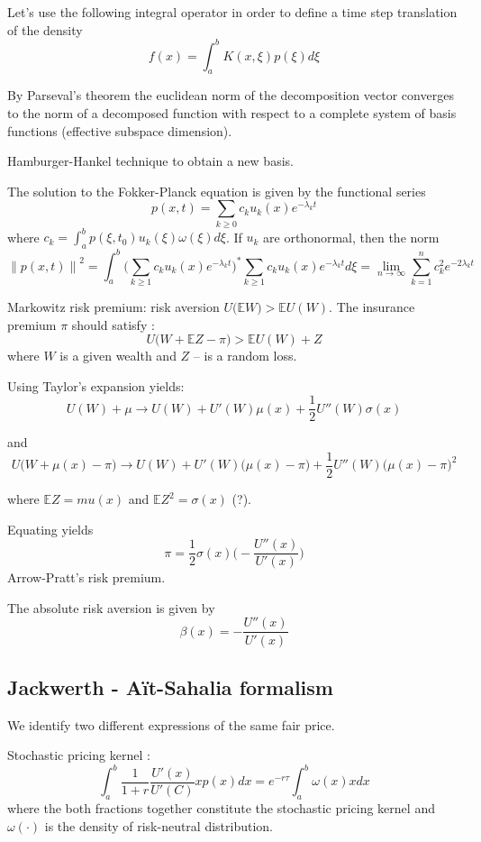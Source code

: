 \documentclass[a4paper]{article}
\newcommand{\nrm}[1]{{\left\| #1 \right \|}}
\newcommand{\Ex}{\mathbb{E}}
\begin{document}
Let's use the following integral operator in order to define a time step translation of the density
\[f(x) = \int_a^b K(x,\xi) p(\xi) d\xi\]

By Parseval's theorem the euclidean norm of the decomposition vector converges to the norm of a decomposed function with respect to a complete system of basis functions (effective subspace dimension).

Hamburger-Hankel technique to obtain a new basis.



The solution to the Fokker-Planck equation is given by the functional series
\[p(x,t) = \sum_{k\geq 0} c_k u_k(x) e^{-\lambda_k t}\]
where $c_k = \int_a^b p(\xi,t_0) u_k(\xi) \omega(\xi) d\xi$.
If $u_k$ are orthonormal, then the norm
\[\nrm{p(x,t)}^2 = \int_a^b \Big( \sum_{k\geq1} c_k u_k(x) e^{-\lambda_k t}\Big)^* \sum_{k\geq1} c_k u_k(x) e^{-\lambda_k t} d\xi = \lim_{n\to \infty} \sum_{k=1}^n c_k^2 e^{-2\lambda_k t} \]


Markowitz risk premium: risk aversion $U\big(\Ex W\big) > \Ex U(W)$.
The insurance premium $\pi$ should satisfy :
\[U\big(W + \Ex Z - \pi) > \Ex U(W) + Z \]
where $W$ is a given wealth and $Z$ -- is a random loss.

Using Taylor's expansion yields:
\[U(W) + \mu \to U(W) + U'(W)\mu(x) + \frac{1}{2} U''(W) \sigma(x)\]

and 
\[U\Big( W + \mu(x) - \pi \Big) \to U(W) + U'(W)\big(\mu(x)-\pi\big) + \frac{1}{2} U''(W) \big(\mu(x)-\pi\big)^2\]

where $\Ex Z = mu(x)$ and $\Ex Z^2 = \sigma(x)$ (?).

Equating yields
\[ \pi = \frac{1}{2}\sigma(x) \Big(-\frac{U''(x)}{U'(x)}\Big)\]
Arrow-Pratt's risk premium.

The absolute risk aversion is given by 
\[\beta(x) = -\frac{U''(x)}{U'(x)}\]

\subsection{Jackwerth - A\"it-Sahalia formalism} %
\label{sub:jackwerth_ait_sahalia_formalism}

We identify two different expressions of the same fair price.


Stochastic pricing kernel :
\[\int_a^b \frac{1}{1+r} \frac{U'(x)}{U'(C)} x p(x) dx = e^{-r\tau} \int_a^b \omega(x) x dx\]
where the both fractions together constitute the stochastic pricing kernel and $\omega(\cdot)$ is the density of risk-neutral distribution.
\end{document}
